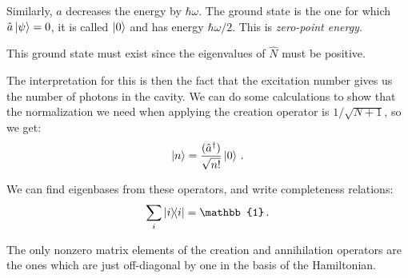 \documentclass[main.tex]{subfiles}
\begin{document}
Similarly, \(\hat{a}\) decreases the energy by \(\hbar \omega \).  The ground state is the one for which \(\hat{a} \ket{\psi }= 0 \), it is called \(\ket{0} \) and has energy \(\hbar \omega /2\). This is \emph{zero-point energy}. 

This ground state must exist since the eigenvalues of \(\hat{N}\) must be positive.

The interpretation for this is then the fact that the excitation number gives us the number of photons in the cavity. We can do some calculations to show that the normalization we need when applying the creation operator is \(1 / \sqrt{N+1}\), so we get: 
%
\begin{align}
\ket{n}  = \frac{(\hat{a}^\dag)}{\sqrt{n!}} \ket{0} 
\,.
\end{align}

We can find eigenbases from these operators, and write completeness relations:
%
\begin{align}
\sum _{i} \ketbra{i}{i} = \mathbb{1}
\,.
\end{align}

The only nonzero matrix elements of the creation and annihilation operators are the ones which are just off-diagonal by one in the basis of the Hamiltonian. 
\end{document}
